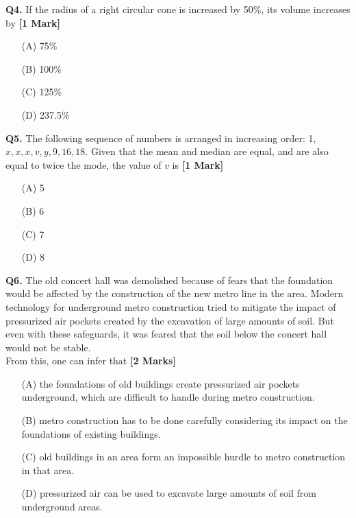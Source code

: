 \documentclass[11pt]{article}
\newcommand{\questiona}[2]{
    \noindent\textbf{Q#2.} #1 \hfill \textbf{[1 Mark]}
}
\newcommand{\questionb}[2]{
    \noindent\textbf{Q#2.} #1 \hfill \textbf{[2 Marks]}
}
\begin{document}
\questiona{If the radius of a right circular cone is increased by 50\%, its volume increases by}{4}
\begin{enumerate}
    \item[(A)] 75\%  
    \item[(B)] 100\%  
    \item[(C)] 125\%  
    \item[(D)] 237.5\%  
\end{enumerate}
\vspace{0.5cm}

\questiona{The following sequence of numbers is arranged in increasing order: 1, \(x, x, x, v, y, 9, 16, 18\). Given that the mean and median are equal, and are also equal to twice the mode, the value of \(v\) is}{5}
\begin{enumerate}
    \item[(A)] 5  
    \item[(B)] 6  
    \item[(C)] 7  
    \item[(D)] 8  
\end{enumerate}
\vspace{0.5cm}

\questionb{The old concert hall was demolished because of fears that the foundation would be affected by the construction of the new metro line in the area. Modern technology for underground metro construction tried to mitigate the impact of pressurized air pockets created by the excavation of large amounts of soil. But even with these safeguards, it was feared that the soil below the concert hall would not be stable. \\ From this, one can infer that}{6}
\begin{enumerate}
    \item[(A)] the foundations of old buildings create pressurized air pockets underground, which are difficult to handle during metro construction.  
    \item[(B)] metro construction has to be done carefully considering its impact on the foundations of existing buildings.  
    \item[(C)] old buildings in an area form an impossible hurdle to metro construction in that area.  
    \item[(D)] pressurized air can be used to excavate large amounts of soil from underground areas.  
\end{enumerate}
\vspace{0.5cm}
\end{document}
